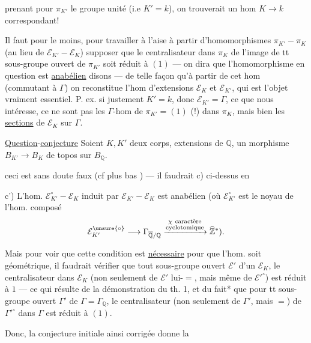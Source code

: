 prenant pour $\pi_{K'}$ le groupe unité (i.e $K'=k$), on trouverait un hom $K\longrightarrow k$ correspondant!

Il faut pour le moins, pour travailler à l'aise à partir d'homomorphismes $\pi_{K'}-\pi_K$ (au lieu de $\mathcal E_{K'}-\mathcal E_K$) supposer que le centralisateur dans $\pi_K$ de l'image de tt sous-groupe ouvert de $\pi_{K'}$ soit réduit à $(1)$ --- on dira que l'homomorphisme en question est \uline{anabélien} disons --- de telle façon qu'à partir de cet hom (commutant à $\Gamma$) on reconstitue l'hom d'extensions $\mathcal E_K$ et $\mathcal E_{K'}$, qui est l'objet vraiment essentiel. P. ex. si justement $K'=k$, donc $\mathcal E_{K'}=\Gamma$, ce que nous intéresse, ce ne sont pas les $\Gamma$-hom de $\pi_{K'}=(1)$ (!) dans $\pi_K$, mais bien les \uline{sections} de $\mathcal E_K$ sur $\Gamma$.

\uline{Question}-\uline{conjecture} Soient $K,K'$ deux corps, extensions   de $\mathbb Q$,   un morphisme $B_{K'}\longrightarrow B_K$ de topos sur $B_{\mathbb Q}$.

ceci est sans doute faux (cf plus bas ) --- il faudrait    c) ci-dessus en

c') L'hom. $\mathcal E_{K'}^\circ-\mathcal E_K$ induit par $\mathcal E_{K'}-\mathcal E_K$ est anabélien (où $\mathcal E_{K'}^\circ$ est le noyau de l'hom. composé
\[
\mathcal E_{K'}^{\unsure{\circ}}\longrightarrow\Gamma_{\overline{\mathbb Q}/\mathbb Q}\xrightarrow{\substack{\chi\ \text{caractère}\\\text{cyclotomique}}}\widehat{\mathbb Z}^{*}).
\]

Mais pour voir que cette condition est \uline{nécessaire} pour que l'hom. soit géométrique, il faudrait  vérifier que  tout sous-groupe ouvert $\mathcal E'$ d'un $\mathcal E_K$, le centralisateur dans $\mathcal E_K$ (non seulement de $\mathcal E'$ lui-$=$, mais même de $\mathcal E'^\circ$) est réduit à $1$ --- ce qui résulte de la démonstration du th. 1, et du fait* que pour tt sous-groupe ouvert $\Gamma'$ de $\Gamma=\Gamma_{\mathbb Q}$, le centralisateur (non seulement de $\Gamma'$, mais $=$) de $\Gamma'^\circ$ dans $\Gamma$ est réduit à $(1)$.

Donc, la conjecture initiale ainsi  corrigée donne la

